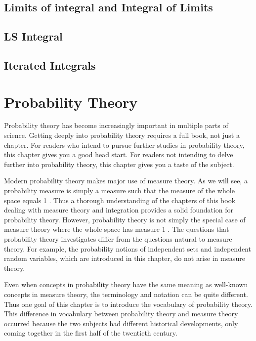 \documentclass[12pt]{book}
\theoremstyle{definition}
\begin{document}
\section{Limits of integral and Integral of Limits}
\section{LS Integral}
\section{Iterated Integrals}





\chapter{Probability Theory}
Probability theory has become increasingly important in multiple parts of science. Getting deeply into probability theory requires a full book, not just a chapter. For readers who intend to pursue further studies in probability theory, this chapter gives you a good head start. For readers not intending to delve further into probability theory, this chapter gives you a taste of the subject.

Modern probability theory makes major use of measure theory. As we will see, a probability measure is simply a measure such that the measure of the whole space equals 1 . Thus a thorough understanding of the chapters of this book dealing with measure theory and integration provides a solid foundation for probability theory.
However, probability theory is not simply the special case of measure theory where the whole space has measure 1 . The questions that probability theory investigates differ from the questions natural to measure theory. For example, the probability notions of independent sets and independent random variables, which are introduced in this chapter, do not arise in measure theory.

Even when concepts in probability theory have the same meaning as well-known concepts in measure theory, the terminology and notation can be quite different. Thus one goal of this chapter is to introduce the vocabulary of probability theory. This difference in vocabulary between probability theory and measure theory occurred because the two subjects had different historical developments, only coming together in the first half of the twentieth century.

\newpage
\end{document}
